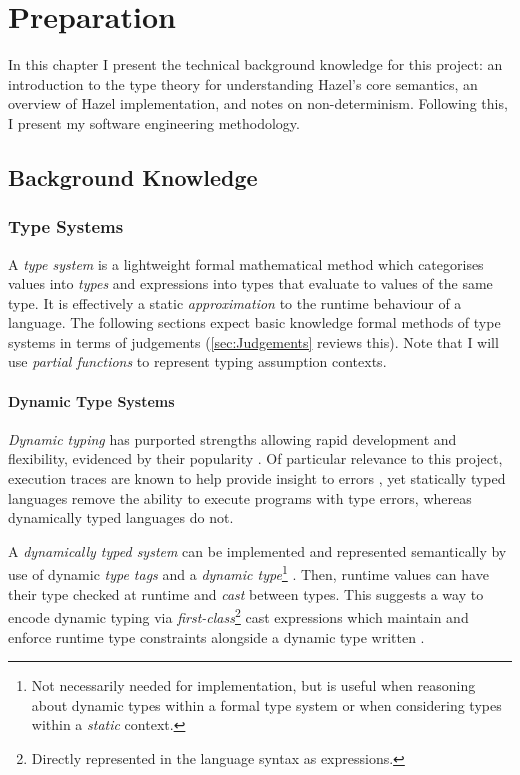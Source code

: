 \chapter{Preparation}
\label{chap:Preparation}
In this chapter I present the technical background knowledge for this project: an introduction to the type theory for understanding Hazel's core semantics, an overview of Hazel implementation, and notes on non-determinism. Following this, I present my software engineering methodology.

\section{Background Knowledge}\label{sec:BackgroundKnowledge}
\subsection{Type Systems}\label{sec:TypeSystems}
A \textit{type system} is a lightweight formal mathematical method which categorises values into \textit{types} and expressions into types that evaluate to values of the same type. It is effectively a static \textit{approximation} to the runtime behaviour of a language. The following sections expect basic knowledge formal methods of type systems in terms of judgements (\cref{sec:Judgements} reviews this). Note that I will use \textit{partial functions} to represent typing assumption contexts. 


\subsubsection{Dynamic Type Systems}\label{sec:DynamicTypeSystem}
\textit{Dynamic typing} has purported strengths allowing rapid development and flexibility, evidenced by their popularity \cite{DynamicLangShift, TIOBE}. Of particular relevance to this project, execution traces are known to help provide insight to errors \cite{TraceVisualisation}, yet statically typed languages remove the ability to execute programs with type errors, whereas dynamically typed languages do not.\par 

A \textit{dynamically typed system} can be implemented and represented semantically by use of dynamic \textit{type tags} and a \textit{dynamic type}\footnote{Not necessarily needed for implementation, but is useful when reasoning about dynamic types within a formal type system or when considering types within a \textit{static} context.} \cite{DynamicTyping}. Then, runtime values can have their type checked at runtime and \textit{cast} between types. This suggests a way to encode dynamic typing via \textit{first-class}\footnote{Directly represented in the language syntax as expressions.} cast expressions which maintain and enforce runtime type constraints alongside a dynamic type written \dyn.

